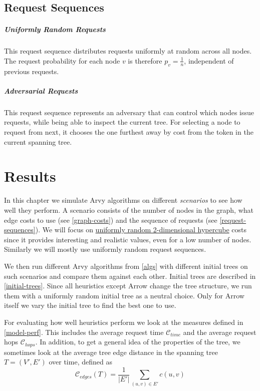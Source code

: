 \documentclass[a4paper, oneside]{discothesis}
\begin{document}
\section{Request Sequences}
\label{request-sequences}

\paragraph{Uniformly Random Requests}\label{req:random} This request sequence distributes requests uniformly at random across all nodes. The request probability for each node $v$ is therefore $p_v=\frac{1}{n}$, independent of previous requests.

\paragraph{Adversarial Requests}\label{req:adversary} This request sequence represents an adversary that can control which nodes issue requests, while being able to inspect the current tree. For selecting a node to request from next, it chooses the one furthest away by cost from the token in the current spanning tree.

\chapter{Results}

In this chapter we simulate Arvy algorithms on different \textit{scenarios} to see how well they perform. A scenario consists of the number of nodes in the graph, what edge costs to use (see \autoref{graph-costs}) and the sequence of requests (see \autoref{request-sequences}). We will focus on \hyperref[costs:cube]{uniformly random 2-dimensional hypercube} costs since it provides interesting and realistic values, even for a low number of nodes. Similarly we will mostly use uniformly random request sequences.

We then run different Arvy algorithms from \autoref{algs} with different initial trees on such scenarios and compare them against each other. Initial trees are described in \autoref{initial-trees}. Since all heuristics except Arrow change the tree structure, we run them with a uniformly random initial tree as a neutral choice. Only for Arrow itself we vary the initial tree to find the best one to use.

For evaluating how well heuristics perform we look at the measures defined in \autoref{model-perf}. This includes the average request time $\mathcal{C}_{time}$ and the average request hops $\mathcal{C}_{hops}$. In addition, to get a general idea of the properties of the tree, we sometimes look at the average tree edge distance in the spanning tree $T=(V',E')$ over time, defined as
\begin{equation}
\mathcal{C}_{edges}(T)=\frac{1}{|E'|}\sum_{(u,v)\in E'}c(u,v)
\end{equation}
\end{document}
